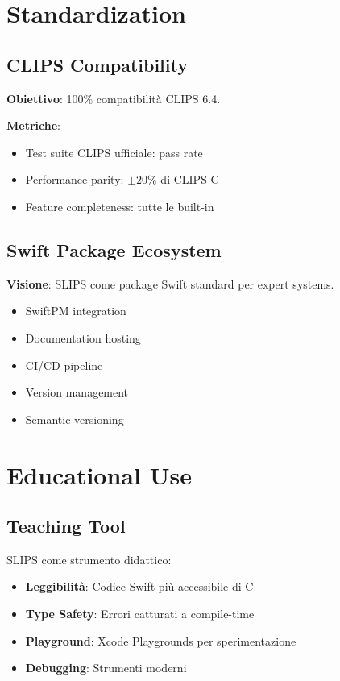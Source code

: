 \section{Standardization}

\subsection{CLIPS Compatibility}

\textbf{Obiettivo}: 100\% compatibilità CLIPS 6.4.

\textbf{Metriche}:
\begin{itemize}
\item Test suite CLIPS ufficiale: pass rate
\item Performance parity: $\pm 20\%$ di CLIPS C
\item Feature completeness: tutte le built-in
\end{itemize}

\subsection{Swift Package Ecosystem}

\textbf{Visione}: SLIPS come package Swift standard per expert systems.

\begin{itemize}
\item SwiftPM integration
\item Documentation hosting
\item CI/CD pipeline
\item Version management
\item Semantic versioning
\end{itemize}

\section{Educational Use}

\subsection{Teaching Tool}

SLIPS come strumento didattico:

\begin{itemize}
\item \textbf{Leggibilità}: Codice Swift più accessibile di C
\item \textbf{Type Safety}: Errori catturati a compile-time
\item \textbf{Playground}: Xcode Playgrounds per sperimentazione
\item \textbf{Debugging}: Strumenti moderni
\end{itemize}


